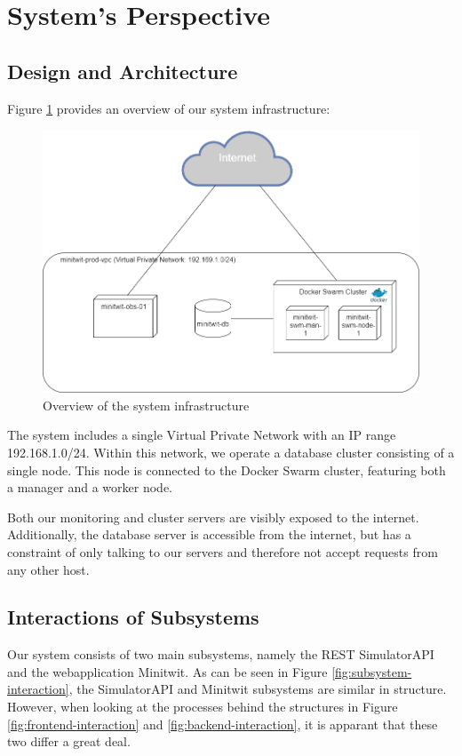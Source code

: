 \section{System's Perspective}

\subsection{Design and Architecture}
Figure \ref{fig:systemoverview} provides an overview of our system infrastructure:
\begin{figure}[H]
    \centering
    \includegraphics[width=0.7\linewidth]{images/system-overview3.png}
    \caption{Overview of the system infrastructure}
    \label{fig:systemoverview}

\end{figure}
The system includes a single Virtual Private Network with an IP range 192.168.1.0/24. Within this network, we operate a database cluster consisting of a single node. This node is connected to the Docker Swarm cluster, featuring both a manager and a worker node.

Both our monitoring and cluster servers are visibly exposed to the internet. Additionally, the database server is accessible from the internet, but has a constraint of only talking to our servers and therefore not accept requests from any other host.

\subsection{Interactions of Subsystems}
Our system consists of two main subsystems, namely the REST SimulatorAPI and the webapplication Minitwit. As can be seen in Figure \ref{fig:subsystem-interaction}, the SimulatorAPI and Minitwit subsystems are similar in structure. However, when looking at the processes behind the structures in Figure \ref{fig:frontend-interaction} and \ref{fig:backend-interaction}, it is apparant that these two differ a great deal.

